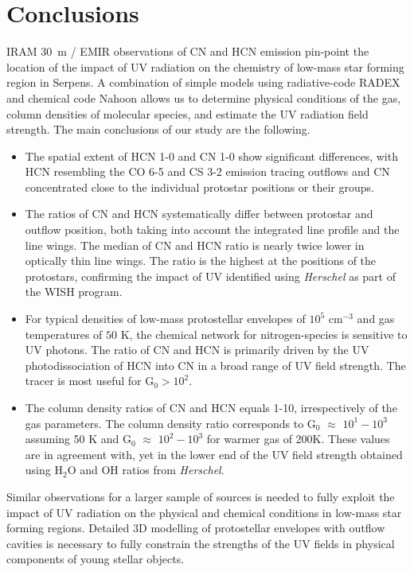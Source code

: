 \documentclass{aa}
\begin{document}
\section{Conclusions}
IRAM 30~m / EMIR observations of CN and HCN emission pin-point the location 
of the impact of UV radiation on the chemistry of low-mass star forming region in Serpens. 
A combination of simple models using radiative-code RADEX and chemical code Nahoon 
allows us to determine physical conditions of the gas, column densities of molecular species,
 and estimate the UV radiation field strength. The main conclusions of our study are the 
 following. 
\begin{itemize} 
\item The spatial extent of HCN 1-0 and CN 1-0 show significant differences, with 
HCN resembling the CO 6-5 and CS 3-2 emission tracing outflows and CN concentrated close to the individual protostar positions or their groups.
\item The ratios of CN and HCN systematically differ between protostar and outflow position,
both taking into account the integrated line profile and the line wings. The median of CN and HCN ratio is nearly twice lower in optically thin line wings. The ratio 
is the highest at the positions of the protostars, confirming the impact of UV identified 
using \textit{Herschel} as part of the WISH program. 
\item For typical densities of low-mass protostellar envelopes of $10^5$ cm$^{-3}$ and 
gas temperatures of $50$ K, the chemical network for nitrogen-species is sensitive to UV photons. The ratio of CN and HCN is primarily driven by the UV photodissociation of HCN into CN in a broad range of UV field strength. The tracer is most useful for G$_\mathrm{0}>10^{2}$. 
\item The column density ratios of CN and HCN equals 1-10, irrespectively of the gas parameters. The column density ratio corresponds to G$_0$ $\approx$ $10^{1}-10^{3}$ assuming 50 K and G$_0$ $\approx$ $10^{2}-10^{3}$ for warmer gas of 200K.
These values are in agreement with, yet in the lower end of the UV field strength obtained using 
H$_2$O and OH ratios from \textit{Herschel}.
\end{itemize}

Similar observations for a larger sample of sources is needed to fully exploit 
the impact of UV radiation on the physical and chemical conditions in low-mass star 
forming regions. Detailed 3D modelling of protostellar envelopes with outflow cavities 
is necessary to fully constrain the strengths of the UV fields in physical components 
of young stellar objects.
\end{document}
